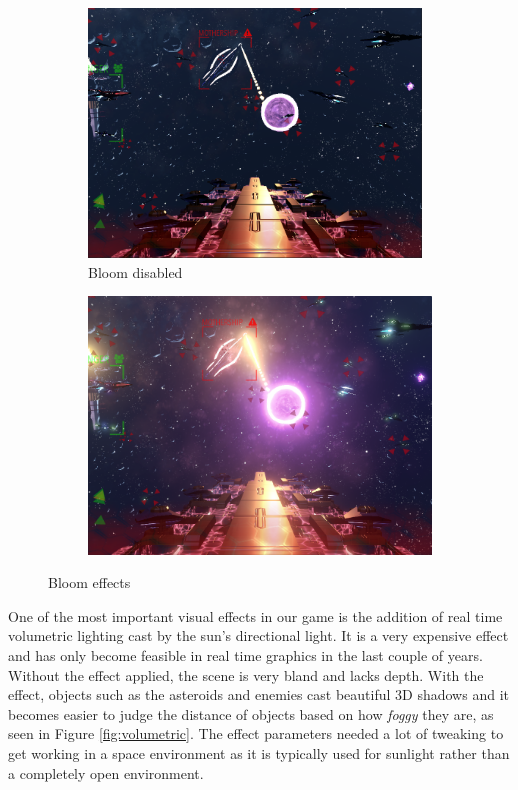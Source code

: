\documentclass[a4paper,11pt]{article}
\begin{document}
\begin{figure}[ht]
	\centering
    
    \begin{subfigure}{.5\textwidth}
      \centering
      \includegraphics[width=0.97\textwidth]{bloomOff}
      \caption{Bloom disabled}
    \end{subfigure}%
    \begin{subfigure}{.5\textwidth}
    	\centering
		\includegraphics[width=.97\textwidth]{bloomOn}
	\end{subfigure}
	\caption{Bloom effects}
	\label{fig:bloom}
\end{figure}

One of the most important visual effects in our game is the addition of real time volumetric lighting cast by the sun’s directional light\cite{volumetric_lighting}. It is a very expensive effect and has only become feasible in real time graphics in the last couple of years. Without the effect applied, the scene is very bland and lacks depth. With the effect, objects such as the asteroids and enemies cast beautiful 3D shadows and it becomes easier to judge the distance of objects based on how \emph{foggy} they are, as seen in Figure \ref{fig:volumetric}. The effect parameters needed a lot of tweaking to get working in a space environment as it is typically used for sunlight rather than a completely open environment.
\end{document}
